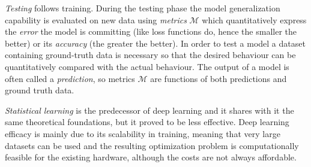 \textit{Testing} follows training.
During the testing phase the model generalization capability is evaluated on new data using \textit{metrics} $\mathcal{M}$ which quantitatively express the \textit{error} the model is committing (like loss functions do, hence the smaller the better) or its \textit{accuracy} (the greater the better).
In order to test a model a dataset containing ground-truth data is necessary so that the desired behaviour can be quantitatively compared with the actual behaviour.
The output of a model is often called a \textit{prediction}, so metrics $\mathcal{M}$ are functions of both predictions and ground truth data.


\textit{Statistical learning} is the predecessor of deep learning and it shares with it the same theoretical foundations, but it proved to be less effective.
Deep learning efficacy is mainly due to its scalability in training, meaning that very large datasets can be used and the resulting optimization problem is computationally feasible for the existing hardware, although the costs are not always affordable.

%
%
%

